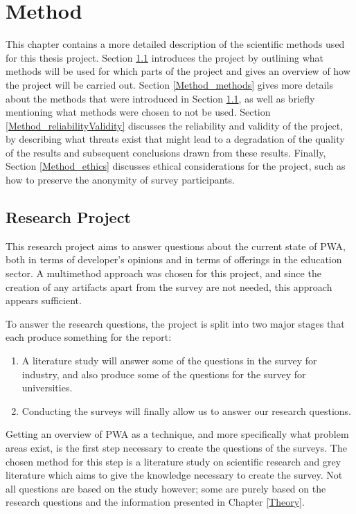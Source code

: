 \documentclass[a4paper,12pt]{article}
\begin{document}
\section{Method}
\label{Method}
This chapter contains a more detailed description of the scientific methods used for this thesis project. Section \ref{Method_project} introduces the project by outlining what methods will be used for which parts of the project and gives an overview of how the project will be carried out. Section \ref{Method_methods} gives more details about the methods that were introduced in Section \ref{Method_project}, as well as briefly mentioning what methods were chosen to not be used. Section \ref{Method_reliabilityValidity} discusses the reliability and validity of the project, by describing what threats exist that might lead to a degradation of the quality of the results and subsequent conclusions drawn from these results. Finally, Section \ref{Method_ethics} discusses ethical considerations for the project, such as how to preserve the anonymity of survey participants.

\subsection{Research Project}
\label{Method_project}
This research project aims to answer questions about the current state of PWA, both in terms of developer’s opinions and in terms of offerings in the education sector. A multimethod approach was chosen for this project, and since the creation of any artifacts apart from the survey are not needed, this approach appears sufficient.

To answer the research questions, the project is split into two major stages that each produce something for the report:

\begin{enumerate}
    \item A literature study will answer some of the questions in the survey for industry, and also produce some of the questions for the survey for universities.
    \item Conducting the surveys will finally allow us to answer our research questions.
\end{enumerate}

Getting an overview of PWA as a technique, and more specifically what problem areas exist, is the first step necessary to create the questions of the surveys. The chosen method for this step is a literature study on scientific research and grey literature which aims to give the knowledge necessary to create the survey. Not all questions are based on the study however; some are purely based on the research questions and the information presented in Chapter \ref{Theory}.
\end{document}
